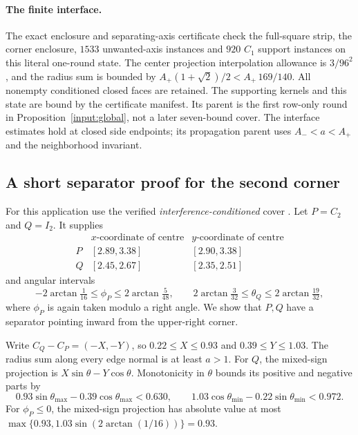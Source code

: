 \documentclass[11pt]{article}
\begin{document}
\paragraph{The finite interface.}
The exact enclosure and separating-axis certificate check the full-square
strip, the corner enclosure, $1533$ unwanted-axis instances and $920$
$C_1$ support instances on this literal one-round state. The center
projection interpolation allowance is $3/96^2$, and the radius sum is
bounded by $A_+(1+\sqrt2)/2<A_+\,169/140$. All nonempty conditioned
closed faces are retained. The supporting kernels and this state are
bound by the certificate manifest. Its parent is the first row-only
round in Proposition~\ref{input:global}, not a later seven-bound cover.
The interface estimates hold at closed side endpoints; its propagation
parent uses $A_-<a<A_+$ and the neighborhood invariant.

\subsection{A short separator proof for the second corner}
\label{app:second-corner-separator}
For this application use the verified
\emph{interference-conditioned} cover
. Let $P=C_2$ and $Q=I_2$.
It supplies
\[
\begin{array}{c|cc}
 &x\text{-coordinate of centre}&y\text{-coordinate of centre}\\ \hline
 P &[2.89,3.38]&[2.90,3.38]\\
 Q &[2.45,2.67]&[2.35,2.51]
\end{array}
\]
and angular intervals
\[
 -2\arctan\tfrac1{16}\le\phi_P\le2\arctan\tfrac5{48},\qquad
 2\arctan\tfrac3{32}\le\theta_Q\le2\arctan\tfrac{19}{32},
\]
where $\phi_P$ is again taken modulo a right angle. We show that $P,Q$
have a separator pointing inward from the upper-right corner.

Write $C_Q-C_P=(-X,-Y)$, so
$0.22\le X\le0.93$ and $0.39\le Y\le1.03$.
The radius sum along every edge normal is at least $a>1$.
For $Q$, the mixed-sign projection is $X\sin\theta-Y\cos\theta$.
Monotonicity in $\theta$ bounds its positive and negative parts by
\[
 0.93\sin\theta_{\max}-0.39\cos\theta_{\max}<0.630,
 \qquad
 1.03\cos\theta_{\min}-0.22\sin\theta_{\min}<0.972.
\]
For $\phi_P\le0$, the mixed-sign projection has absolute value at most
$\max\{0.93,1.03\sin(2\arctan(1/16))\}=0.93$.
\end{document}
